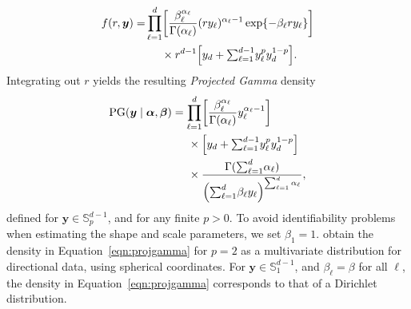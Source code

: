   \begin{equation}
  \label{joint}
    \begin{aligned}
    f(r,\bm{ y}) = &\prod_{\ell = 1}^{d}
      \left[\frac{\beta_{\ell}^{\alpha_{\ell}}}{\Gamma(\alpha_{\ell})}(ry_{\ell})^{\alpha_{\ell} - 1}
          \exp\lbrace-\beta_{\ell}ry_{\ell}\rbrace\right] \\
      &\hspace{0.5cm}\times r^{d-1}\left[y_d +
            {\textstyle \sum}_{\ell = 1}^{d-1}y_{\ell}^p y_d^{1 - p}\right].
    \end{aligned}
  \end{equation}
  Integrating out $r$ yields the resulting \emph{Projected Gamma} density
  \begin{equation}
    \label{eqn:projgamma}
    \begin{aligned}
    \text{PG}(\bm{ y}\mid\bm{ \alpha},\bm{ \beta}) &=
          \prod_{\ell = 1}^d\left[\frac{\beta_{\ell}^{\alpha_{\ell}}}{\Gamma(\alpha_{\ell})}
                y_{\ell}^{\alpha_{\ell} - 1}\right]\\
      &\hspace{0.5cm}\times \left[y_d +
          {\textstyle \sum}_{\ell = 1}^{d-1}y_{\ell}^p y_d^{1 - p}\right]\\
      &\hspace{0.5cm}\times \frac{\Gamma({\textstyle\sum}_{\ell = 1}^d\alpha_{\ell})}{\left({\textstyle\sum}_{\ell = 1}^d
                    \beta_{\ell}y_{\ell}\right)^{{\scriptstyle\sum_{\ell = 1}^d \alpha_{\ell}}}},
    \end{aligned}
  \end{equation}
  defined for $\bm{y}\in {\mathbb S}_p^{d-1}$, and for any finite $p>0$. To avoid identifiability 
  problems when estimating the shape and scale parameters, we set $\beta_1 = 1$.
  \cite{nunez2019} obtain the density in Equation~\eqref{eqn:projgamma}
  for $p=2$ as a multivariate distribution for directional data, using spherical coordinates.  
  For $\bm{ y}\in {\mathbb S}_1^{d-1}$, and $\beta_{\ell} = \beta$ for all $\ell$, the density in
  Equation~\eqref{eqn:projgamma} corresponds to that of a Dirichlet distribution.
  

